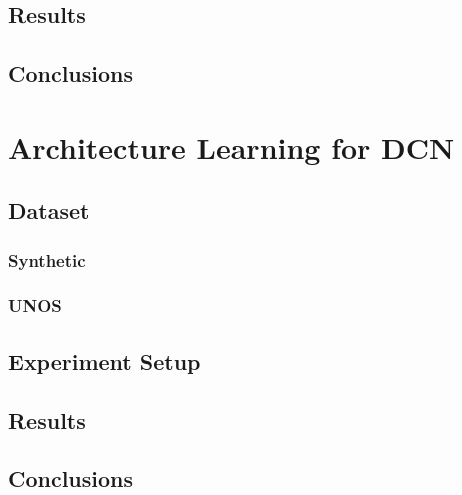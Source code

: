 \subsection{Results}

\subsection{Conclusions}

\section{Architecture Learning for DCN}
\subsection{Dataset}
\subsubsection{Synthetic}
\subsubsection{UNOS}

\subsection{Experiment Setup}

\subsection{Results}

\subsection{Conclusions}